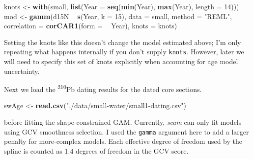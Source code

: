 \documentclass[12pt,]{article}
\newenvironment{Shaded}{\begin{snugshade}}{\end{snugshade}}
\newcommand{\CommentTok}[1]{\textcolor[rgb]{0.56,0.35,0.01}{\textit{#1}}}
\newcommand{\DataTypeTok}[1]{\textcolor[rgb]{0.13,0.29,0.53}{#1}}
\newcommand{\DecValTok}[1]{\textcolor[rgb]{0.00,0.00,0.81}{#1}}
\newcommand{\KeywordTok}[1]{\textcolor[rgb]{0.13,0.29,0.53}{\textbf{#1}}}
\newcommand{\NormalTok}[1]{#1}
\newcommand{\OperatorTok}[1]{\textcolor[rgb]{0.81,0.36,0.00}{\textbf{#1}}}
\newcommand{\StringTok}[1]{\textcolor[rgb]{0.31,0.60,0.02}{#1}}
\begin{document}
\begin{Shaded}
\begin{Highlighting}[]
\NormalTok{knots <-}\StringTok{ }\KeywordTok{with}\NormalTok{(small, }\KeywordTok{list}\NormalTok{(}\DataTypeTok{Year =} \KeywordTok{seq}\NormalTok{(}\KeywordTok{min}\NormalTok{(Year), }\KeywordTok{max}\NormalTok{(Year), }\DataTypeTok{length =} \DecValTok{14}\NormalTok{)))}
\NormalTok{mod <-}\StringTok{ }\KeywordTok{gamm}\NormalTok{(d15N }\OperatorTok{~}\StringTok{ }\KeywordTok{s}\NormalTok{(Year, }\DataTypeTok{k =} \DecValTok{15}\NormalTok{), }\DataTypeTok{data =}\NormalTok{ small, }\DataTypeTok{method =} \StringTok{"REML"}\NormalTok{,}
            \DataTypeTok{correlation =} \KeywordTok{corCAR1}\NormalTok{(}\DataTypeTok{form =} \OperatorTok{~}\StringTok{ }\NormalTok{Year),}
            \DataTypeTok{knots =}\NormalTok{ knots)}
\end{Highlighting}
\end{Shaded}

Setting the knots like this doesn't change the model estimated above;
I'm only repeating what happens internally if you don't supply
\texttt{knots}. However, later we will need to specify this set of knots
explicitly when accounting for age model uncertainty.

Next we load the \textsuperscript{210}Pb dating results for the dated
core sections.

\begin{Shaded}
\begin{Highlighting}[]
\NormalTok{swAge <-}\StringTok{ }\KeywordTok{read.csv}\NormalTok{(}\StringTok{"./data/small-water/small1-dating.csv"}\NormalTok{)}
\end{Highlighting}
\end{Shaded}

before fitting the shape-constrained GAM. Currently, \emph{scam} can
only fit models using GCV smoothness selection. I used the
\texttt{gamma} argument here to add a larger penalty for more-complex
models. Each effective degree of freedom used by the spline is counted
as 1.4 degrees of freedom in the GCV score.

\begin{Shaded}
\end{Shaded}
\end{document}
